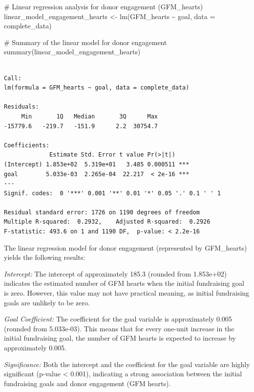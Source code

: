 \documentclass[
  letterpaper,
  DIV=11,
  numbers=noendperiod]{scrartcl}
\newenvironment{Shaded}{\begin{snugshade}}{\end{snugshade}}
\newcommand{\AttributeTok}[1]{\textcolor[rgb]{0.40,0.45,0.13}{#1}}
\newcommand{\CommentTok}[1]{\textcolor[rgb]{0.37,0.37,0.37}{#1}}
\newcommand{\FunctionTok}[1]{\textcolor[rgb]{0.28,0.35,0.67}{#1}}
\newcommand{\NormalTok}[1]{\textcolor[rgb]{0.00,0.23,0.31}{#1}}
\newcommand{\OtherTok}[1]{\textcolor[rgb]{0.00,0.23,0.31}{#1}}
\newcommand{\SpecialCharTok}[1]{\textcolor[rgb]{0.37,0.37,0.37}{#1}}
\begin{document}
\begin{Shaded}
\begin{Highlighting}[]
\CommentTok{\# Linear regression analysis for donor engagement (GFM\_hearts)}
\NormalTok{linear\_model\_engagement\_hearts }\OtherTok{\textless{}{-}} \FunctionTok{lm}\NormalTok{(GFM\_hearts }\SpecialCharTok{\textasciitilde{}}\NormalTok{ goal, }\AttributeTok{data =}\NormalTok{ complete\_data)  }

\CommentTok{\# Summary of the linear model for donor engagement}
\FunctionTok{summary}\NormalTok{(linear\_model\_engagement\_hearts)}
\end{Highlighting}
\end{Shaded}

\begin{verbatim}

Call:
lm(formula = GFM_hearts ~ goal, data = complete_data)

Residuals:
     Min       1Q   Median       3Q      Max 
-15779.6   -219.7   -151.9      2.2  30754.7 

Coefficients:
             Estimate Std. Error t value Pr(>|t|)    
(Intercept) 1.853e+02  5.319e+01   3.485 0.000511 ***
goal        5.033e-03  2.265e-04  22.217  < 2e-16 ***
---
Signif. codes:  0 '***' 0.001 '**' 0.01 '*' 0.05 '.' 0.1 ' ' 1

Residual standard error: 1726 on 1190 degrees of freedom
Multiple R-squared:  0.2932,    Adjusted R-squared:  0.2926 
F-statistic: 493.6 on 1 and 1190 DF,  p-value: < 2.2e-16
\end{verbatim}

The linear regression model for donor engagement (represented by
GFM\_hearts) yields the following results:

\emph{Intercept:} The intercept of approximately 185.3 (rounded from
1.853e+02) indicates the estimated number of GFM hearts when the initial
fundraising goal is zero. However, this value may not have practical
meaning, as initial fundraising goals are unlikely to be zero.

\emph{Goal Coefficient:} The coefficient for the goal variable is
approximately 0.005 (rounded from 5.033e-03). This means that for every
one-unit increase in the initial fundraising goal, the number of GFM
hearts is expected to increase by approximately 0.005.

\emph{Significance:} Both the intercept and the coefficient for the goal
variable are highly significant (p-value \textless{} 0.001), indicating
a strong association between the initial fundraising goals and donor
engagement (GFM hearts).
\end{document}
